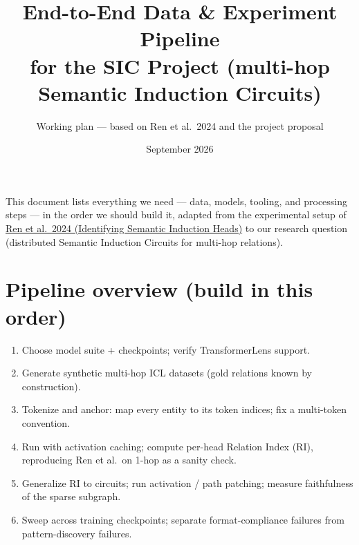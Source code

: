 \documentclass[11pt]{article}
\title{End-to-End Data \& Experiment Pipeline\\for the SIC Project (multi-hop Semantic Induction Circuits)}
\author{Working plan --- based on Ren et al.\ 2024 and the project proposal}
\date{September 2026}
\begin{document}
\maketitle

\noindent This document lists everything we need --- data, models, tooling, and processing steps --- in the order we should build it, adapted from the experimental setup of
\href{https://arxiv.org/abs/2402.13055}{Ren et al.\ 2024 (Identifying Semantic Induction Heads)} to our research question (distributed Semantic Induction Circuits for multi-hop relations).

\section{Pipeline overview (build in this order)}
\begin{enumerate}[itemsep=2pt]
  \item Choose model suite + checkpoints; verify TransformerLens support.
  \item Generate synthetic multi-hop ICL datasets (gold relations known by construction).
  \item Tokenize and anchor: map every entity to its token indices; fix a multi-token convention.
  \item Run with activation caching; compute per-head Relation Index (RI), reproducing Ren et al.\ on 1-hop as a sanity check.
  \item Generalize RI to circuits; run activation / path patching; measure faithfulness of the sparse subgraph.
  \item Sweep across training checkpoints; separate format-compliance failures from pattern-discovery failures.
\end{enumerate}
\end{document}
